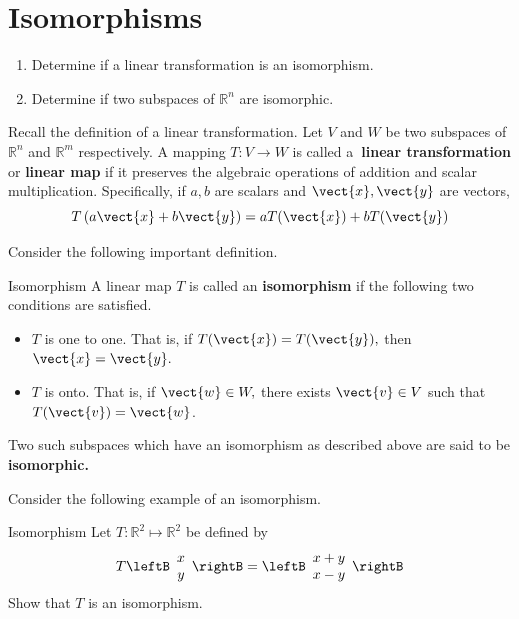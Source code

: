 \section{Isomorphisms}

\begin{outcome}
\begin{enumerate}
\item[A.]  Determine if a linear transformation is an isomorphism.

\item[B.]  Determine if two subspaces of $\mathbb{R}^n$ are isomorphic. 
\end{enumerate}
\end{outcome}

Recall the definition of a linear transformation. Let $V$ and $W$ be two subspaces of $\mathbb{R}^{n}$ and $\mathbb{R}^{m}$
respectively. A mapping $T:V\rightarrow W$ is called a\textbf{\ linear
transformation} or \textbf{linear map} if it preserves the algebraic
operations of addition and
 scalar multiplication. Specifically, if $a,b$
are scalars and $
\vect{x},\vect{y}$ are vectors, 
\begin{equation*}
T\left( a\vect{x}+b\vect{y}\right) =aT(\vect{x})+bT(\vect{y})
\end{equation*}

Consider the following important definition.

\begin{definition}{Isomorphism}\label{def:isomorphism}
A linear map $T$ is called an \textbf{isomorphism} 
if the following two conditions are satisfied.

\begin{itemize}
\item $T$ is one to one. That is, if $T(\vect{x})=T(\vect{y}),$ then $\vect{x}=\vect{y}.$

\item $T$ is onto. That is, if $\vect{w}\in W,$ there exists $
\vect{v}\in V$ such that $T(\vect{v})=\vect{w}$.
\end{itemize}

Two such subspaces which have an isomorphism as described above are said to
be \textbf{isomorphic.}
\end{definition}

Consider the following example of an isomorphism.

\begin{example}{Isomorphism}\label{exa:isomorphism}
Let $T: \mathbb{R}^2 \mapsto \mathbb{R}^2$ be defined by 
\[
T \leftB \begin{array}{c}
x \\
y
\end{array} \rightB = \leftB \begin{array}{c}
x + y \\
x - y 
\end{array} \rightB
\]
Show that $T$ is an isomorphism.
\end{example}

